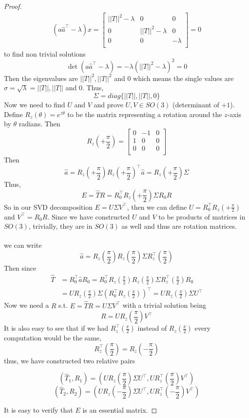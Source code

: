 \documentclass{article}
\begin{document}
\begin{proof}
\begin{align*}
({a}\hat{a}^\top-\lambda)x = \begin{bmatrix}
     ||T||^2 -\lambda &     0     &  0\\
      0      &   ||T||^2-\lambda &  0 \\
      0      &     0     &  -\lambda \\
\end{bmatrix}
= 0
\end{align*}
to find non trivial solutions 
$$\det{({a}\hat{a}^\top-\lambda)} = -\lambda(||T||^2-\lambda)^2=0$$
Then the eigenvalues are $||T||^2,||T||^2$ and 0 which means the single values are $\sigma = \sqrt{\lambda} = ||T||, ||T||$ and 0.
Thus,
$$\Sigma = diag\{||T||, ||T||, 0\}$$
Now we need to find $U$ and $V$ and prove $U, V \in SO(3)$ (determinant of $+1$).\\
Define $R_z(\theta) = e^{z\theta}$ to be the matrix representing a rotation around the $z$-axis by $\theta$ radians. Then
$$
R_z\left(+\frac{\pi}{2}\right)= \begin{bmatrix}
      0      &     -1    &  0\\
      1      &     0     &  0 \\
      0      &     0     &  0 \\
\end{bmatrix}$$
Then $$\hat{a} = R_z\left(+\frac{\pi}{2}\right)R_z\left(+\frac{\pi}{2}\right)^\top\hat{a} = R_z\left(+\frac{\pi}{2}\right)\Sigma$$
Thus,
$$E = \hat{T}R=R_0^\top R_z\left(+\frac{\pi}{2}\right)\Sigma R_0R$$
So in our SVD decomposition $E=U\Sigma V^\top$, then we can define $U=R_0^\top R_z\left(+\frac{\pi}{2}\right)$ and $V^\top = R_0R$. Since we have constructed $U$ and $V$ to be products of matrices in $SO(3)$, trivially, they are in $SO(3)$ as well and thus are rotation matrices.\\\\
we can write
$$\hat{a} = R_z(\frac{\pi}{2})R_z(\frac{\pi}{2})\Sigma R_z^\top(\frac{\pi}{2})$$
Then since
\begin{align*}
\hat{T} &= R_0^\top \hat{a} R_0= R_0^\top R_z(\frac{\pi}{2})R_z(\frac{\pi}{2})\Sigma R_z^\top(\frac{\pi}{2}) R_0\\
&= UR_z(\frac{\pi}{2})\Sigma (R_0^\top R_z(\frac{\pi}{2}))^\top = UR_z(\frac{\pi}{2})\Sigma U^\top 
\end{align*}
Now we need a $R$ s.t. $E = \hat{T}R = U\Sigma V^\top$ with a trivial solution being
$$R = UR_z(\frac{\pi}{2})V^\top$$
It is also easy to see that if we had $R_z^\top(\frac{\pi}{2})$ instead of $R_z(\frac{\pi}{2})$ every computation would be the same, 
$$R_z^\top(\frac{\pi}{2}) = R_z(-\frac{\pi}{2})$$
thus, we have constructed two relative pairs 
\begin{tcolorbox}[enhanced,breakable, colback=blue!5!white, colframe=blue!55!black, boxrule=0.5pt, arc=4pt, boxsep=0pt, left=6pt, right=6pt, drop shadow=black!40!white]
$$(\hat{T}_1, R_1) = (UR_z(\frac{\pi}{2})\Sigma U^\top, UR_z^\top(\frac{\pi}{2})V^\top)$$
$$(\hat{T}_2, R_2) = (UR_z(-\frac{\pi}{2})\Sigma U^\top, UR_z^\top(-\frac{\pi}{2})V^\top)$$
\end{tcolorbox}
It is easy to verify that $E$ is an essential matrix.


\end{proof}
\end{document}
